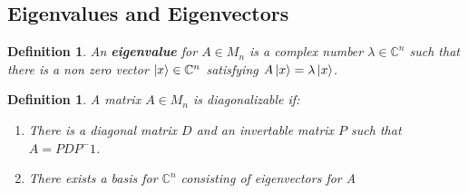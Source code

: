 \documentclass[12pt]{article}
\theoremstyle{plain}
\theoremstyle{nonumberplain}
\theoremstyle{plain}
\newtheorem{definition}[lemma]{Definition}
\theoremstyle{nonumberplain}
\newcommand\1{{\bf 1}}
\newcommand{\C}{\mathbb{C}} %
\newcommand{\<}{\left\langle}
\renewcommand{\>}{\right\rangle}
\begin{document}

\subsection{Eigenvalues and Eigenvectors}

\begin{definition}
An \textbf{eigenvalue} for $A\in M_n$ is a complex number $\lambda\in\C^n$ such that there is a non zero vector $\ket{x}\in\C^n$ satisfying $A\ket{x}=\lambda\ket{x}$.
\end{definition}
\begin{definition}
A matrix $A\in M_n$ is diagonalizable if:
\begin{enumerate}
\item There is a diagonal matrix $D$ and an invertable  matrix $P$ such that $A=PDP^-1$.
\item There exists a basis for $\C^n$ consisting of eigenvectors for A
\end{enumerate}
\end{definition}
\end{document}
